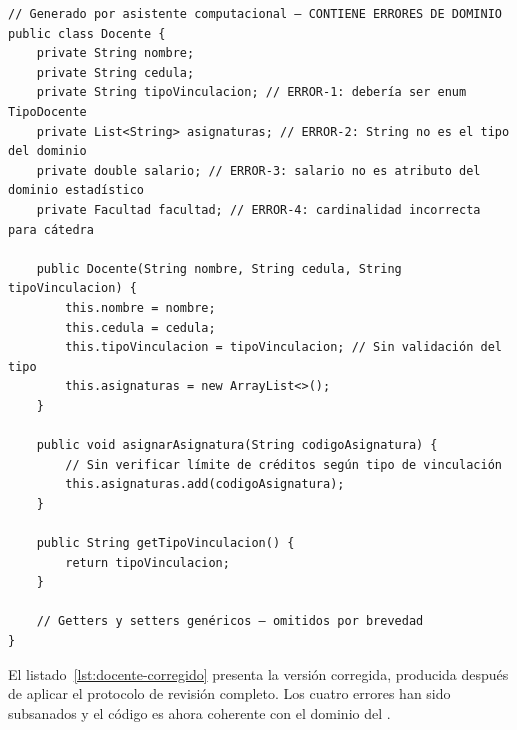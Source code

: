 \begin{lstlisting}[style=javaStyle,
  caption={Clase \texttt{Docente} generada por asistente computacional.
    El código compila sin errores pero contiene cuatro violaciones del dominio
    estatutario, identificadas con comentarios \texttt{// ERROR-n:}.},
  label={lst:docente-generado-erroneo}]
// Generado por asistente computacional — CONTIENE ERRORES DE DOMINIO
public class Docente {
    private String nombre;
    private String cedula;
    private String tipoVinculacion; // ERROR-1: debería ser enum TipoDocente
    private List<String> asignaturas; // ERROR-2: String no es el tipo del dominio
    private double salario; // ERROR-3: salario no es atributo del dominio estadístico
    private Facultad facultad; // ERROR-4: cardinalidad incorrecta para cátedra

    public Docente(String nombre, String cedula, String tipoVinculacion) {
        this.nombre = nombre;
        this.cedula = cedula;
        this.tipoVinculacion = tipoVinculacion; // Sin validación del tipo
        this.asignaturas = new ArrayList<>();
    }

    public void asignarAsignatura(String codigoAsignatura) {
        // Sin verificar límite de créditos según tipo de vinculación
        this.asignaturas.add(codigoAsignatura);
    }

    public String getTipoVinculacion() {
        return tipoVinculacion;
    }

    // Getters y setters genéricos — omitidos por brevedad
}
\end{lstlisting}

El listado~\ref{lst:docente-corregido} presenta la versión corregida, producida
después de aplicar el protocolo de revisión completo. Los cuatro errores han
sido subsanados y el código es ahora coherente con el dominio del \acuerdo.

